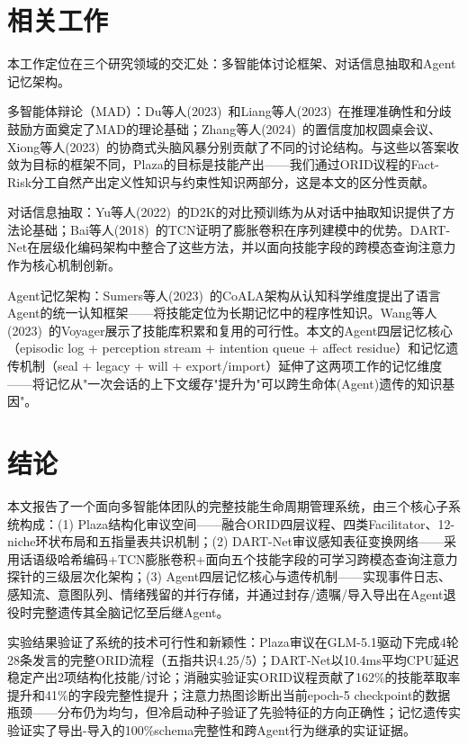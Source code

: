 \documentclass[twocolumn,10.5pt]{ctexart}
\begin{document}
\section{相关工作}

本工作定位在三个研究领域的交汇处：多智能体讨论框架、对话信息抽取和Agent记忆架构。

多智能体辩论（MAD）：Du等人(2023)~\cite{du2023improving}和Liang等人(2023)~\cite{liang2023encouraging}在推理准确性和分歧鼓励方面奠定了MAD的理论基础；Zhang等人(2024)~\cite{zhang2024reconcile}的置信度加权圆桌会议、Xiong等人(2023)~\cite{xiong2023dubi}的协商式头脑风暴分别贡献了不同的讨论结构。与这些以答案收敛为目标的框架不同，Plaza的目标是技能产出——我们通过ORID议程的Fact-Risk分工自然产出定义性知识与约束性知识两部分，这是本文的区分性贡献。

对话信息抽取：Yu等人(2022)~\cite{yu2022d2k}的D2K的对比预训练为从对话中抽取知识提供了方法论基础；Bai等人(2018)~\cite{bai2018tcn}的TCN证明了膨胀卷积在序列建模中的优势。DART-Net在层级化编码架构中整合了这些方法，并以面向技能字段的跨模态查询注意力作为核心机制创新。

Agent记忆架构：Sumers等人(2023)~\cite{sumers2023coala}的CoALA架构从认知科学维度提出了语言Agent的统一认知框架——将技能定位为长期记忆中的程序性知识。Wang等人(2023)~\cite{wang2023voyager}的Voyager展示了技能库积累和复用的可行性。本文的Agent四层记忆核心（episodic log + perception stream + intention queue + affect residue）和记忆遗传机制（seal + legacy + will + export/import）延伸了这两项工作的记忆维度——将记忆从"一次会话的上下文缓存"提升为"可以跨生命体(Agent)遗传的知识基因"。

\section{结论}

本文报告了一个面向多智能体团队的完整技能生命周期管理系统，由三个核心子系统构成：(1) Plaza结构化审议空间——融合ORID四层议程、四类Facilitator、12-niche环状布局和五指量表共识机制；(2) DART-Net审议感知表征变换网络——采用话语级哈希编码+TCN膨胀卷积+面向五个技能字段的可学习跨模态查询注意力探针的三级层次化架构；(3) Agent四层记忆核心与遗传机制——实现事件日志、感知流、意图队列、情绪残留的并行存储，并通过封存/遗嘱/导入导出在Agent退役时完整遗传其全脑记忆至后继Agent。

实验结果验证了系统的技术可行性和新颖性：Plaza审议在GLM-5.1驱动下完成4轮28条发言的完整ORID流程（五指共识4.25/5）；DART-Net以10.4ms平均CPU延迟稳定产出2项结构化技能/讨论；消融实验证实ORID议程贡献了162\%的技能萃取率提升和41\%的字段完整性提升；注意力热图诊断出当前epoch-5 checkpoint的数据瓶颈——分布仍为均匀，但冷启动种子验证了先验特征的方向正确性；记忆遗传实验证实了导出-导入的100\%schema完整性和跨Agent行为继承的实证证据。
\end{document}
